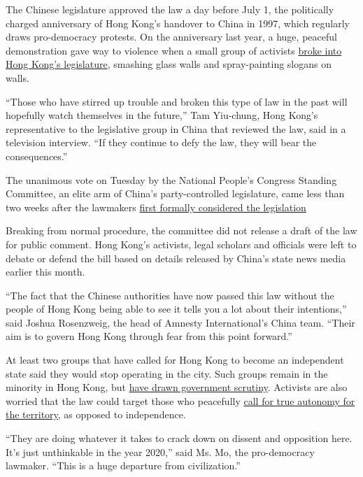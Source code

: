 The Chinese legislature approved the law a day before July 1, the
politically charged anniversary of Hong Kong's handover to China in
1997, which regularly draws pro-democracy protests. On the anniversary
last year, a huge, peaceful demonstration gave way to violence when a
small group of activists
\href{https://www.nytimes3xbfgragh.onion/2019/07/01/world/asia/china-hong-kong-protest.html}{broke
into Hong Kong's legislature}, smashing glass walls and spray-painting
slogans on walls.

``Those who have stirred up trouble and broken this type of law in the
past will hopefully watch themselves in the future,'' Tam Yiu-chung,
Hong Kong's representative to the legislative group in China that
reviewed the law, said in a television interview. ``If they continue to
defy the law, they will bear the consequences.''

The unanimous vote on Tuesday by the National People's Congress Standing
Committee, an elite arm of China's party-controlled legislature, came
less than two weeks after the lawmakers
\href{https://www.nytimes3xbfgragh.onion/2020/06/20/world/asia/china-hong-kong-security-law.html}{first
formally considered the legislation}

Breaking from normal procedure, the committee did not release a draft of
the law for public comment. Hong Kong's activists, legal scholars and
officials were left to debate or defend the bill based on details
released by China's state news media earlier this month.

``The fact that the Chinese authorities have now passed this law without
the people of Hong Kong being able to see it tells you a lot about their
intentions,'' said Joshua Rosenzweig, the head of Amnesty
International's China team. ``Their aim is to govern Hong Kong through
fear from this point forward.''

At least two groups that have called for Hong Kong to become an
independent state said they would stop operating in the city. Such
groups remain in the minority in Hong Kong, but
\href{https://www.nytimes3xbfgragh.onion/2018/09/24/world/asia/hong-kong-party-ban-andy-chan.html}{have
drawn government scrutiny}. Activists are also worried that the law
could target those who peacefully
\href{https://www.nytimes3xbfgragh.onion/2019/08/12/world/asia/hong-kong-protests-communist-party.html}{call
for true autonomy for the territory}, as opposed to independence.

``They are doing whatever it takes to crack down on dissent and
opposition here. It's just unthinkable in the year 2020,'' said Ms. Mo,
the pro-democracy lawmaker. ``This is a huge departure from
civilization.''

